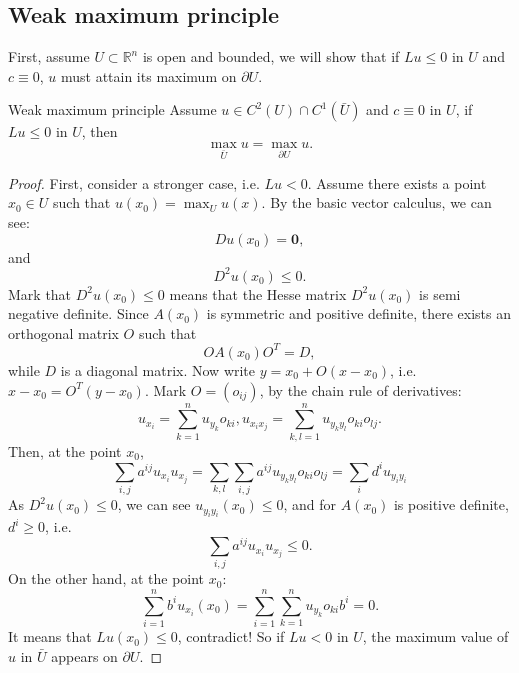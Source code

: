 \subsection{Weak maximum principle}
First, assume $U\subset\mathbb{R}^{n}$ is open and bounded, we will show that if $Lu\le 0$ in $U$ and $c\equiv 0$, $u$ must attain its maximum on $\partial U$.
\begin{theorem}{Weak maximum principle}
    \label{thm:WMP}
    Assume $u\in C^{2}(U)\cap C^{1}(\bar{U})$ and $c\equiv 0$ in $U$, if $Lu\le 0$ in $U$, then
    \begin{equation}
        \label{eq:max_principle}
        \max_{\bar{U}}u=\max_{\partial U}u.
    \end{equation}
\end{theorem} 
\begin{proof}
    First, consider a stronger case, i.e. $Lu<0$. Assume there exists a point $x_{0}\in U$ such that $u(x_{0})=\max_{U}u(x)$. By the basic vector calculus, we can see:
    \begin{equation}
        \label{eq:one_order}
        Du(x_{0})=\mathbf{0},
    \end{equation}
    and 
    \begin{equation}
        \label{eq:two_order}
        D^{2}u(x_{0})\le 0.
    \end{equation}
    Mark that $D^{2}u(x_{0})\le 0$ means that the Hesse matrix $D^{2}u(x_{0})$ is semi negative definite. Since $A(x_{0})$ is symmetric and positive definite, there exists an orthogonal matrix $O$ such that 
    \begin{equation}
        OA(x_{0})O^{T}=D,
    \end{equation}
    while $D$ is a diagonal matrix. Now write $y=x_{0}+O(x-x_{0})$, i.e. $x-x_{0}=O^{T}(y-x_{0})$. Mark $O=(o_{ij})$, by the chain rule of derivatives:
    \begin{equation}
        u_{x_{i}}=\sum_{k=1}^{n}u_{y_{k}}o_{ki},u_{x_{i}x_{j}}=\sum_{k,l=1}^{n}u_{y_{k}y_{l}}o_{ki}o_{lj}.
    \end{equation}
    Then, at the point $x_{0}$,
    \begin{equation}
        \sum_{i,j}a^{ij}u_{x_{i}}u_{x_{j}}=\sum_{k,l}\sum_{i,j} a^{ij}u_{y_{k}y_{l}}o_{ki}o_{lj}=\sum_{i} d^{i}u_{y_{i}y_{i}}
    \end{equation}
    As $D^{2}u(x_{0})\le 0$, we can see $u_{y_{i}y_{i}}(x_{0})\le 0$, and for $A(x_{0})$ is positive definite, $d^{i}\ge 0$, i.e. 
    \begin{equation}
        \sum_{i,j}a^{ij}u_{x_{i}}u_{x_{j}}\le 0.
    \end{equation}
    On the other hand, at the point $x_{0}$:
    \begin{equation}
        \sum_{i=1}^{n}b^{i}u_{x_{i}}(x_{0})=\sum_{i=1}^{n}\sum_{k=1}^{n}u_{y_{k}}o_{ki}b^{i}=0.
    \end{equation}
    It means that $Lu(x_{0})\le 0$, contradict! So if $Lu<0$ in $U$, the maximum value of $u$ in $\bar{U}$ appears on $\partial U$.


\end{proof}

